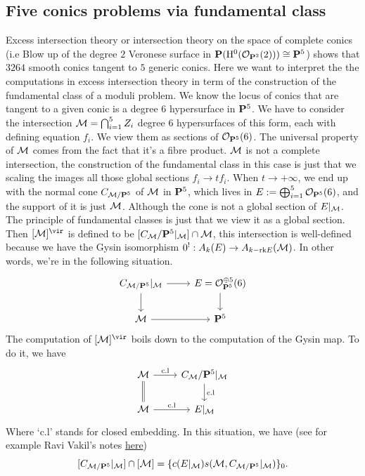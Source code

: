 \documentclass[../main.tex]{subfiles}
\begin{document}
\subsection{Five conics problems via fundamental class}
Excess intersection theory or intersection theory on the space of complete conics (i.e Blow up of the degree $2$ Veronese surface in $\P(\H^{0}(\O_{\P^{2}}(2)))\cong \P^{5}$) shows that $3264$ smooth conics tangent to $5$ generic conics. Here we want to interpret the the computations in excess intersection theory in term of the construction of the fundamental class of a moduli problem. We know the locus of conics that are tangent to a given conic is a degree $6$ hypersurface in $\P^{5}$. We have to consider the intersection $\M=\bigcap_{i=1}^{5}Z_{i}$ degree $6$ hypersurfaces of this form, each with defining equation $f_{i}$. We view them as sections of $\O_{\P^{5}}(6)$. The universal property of $\M$ comes from the fact that it's a fibre product. $\M$ is not a complete intersection, the construction of the fundamental class in this case is just that we scaling the images all those global sections $f_{i}\rightarrow tf_{i}$. When $t\rightarrow +\infty$, we end up with the normal cone $C_{\M/\P^{5}}$ of $\M$ in $\P^{5}$, which lives in $E:=\bigoplus_{i=1}^{5}\O_{\P^{5}}(6)$, and the support of it is just $\M$.  Although the cone is not a global section of $E|_{\M}$. The principle of fundamental classes is just that we view it as a global section. Then $[\M]^{\vir}$ is defined to be $[C_{\M}/\P^{5}|_{\M}]\cap \M$, this intersection is well-defined because we have the Gysin isomorphism $0^{!}: A_{k}(E)\rightarrow A_{k-\mathrm{rk}{E}}(\M)$. In other words, we're in the following situation.
$$
\begin{tikzcd}
C_{\M/\P^{5}}|_{\M}\arrow{r}\arrow{d} & E=\O^{\oplus 5}_{\P^{5}}(6)\arrow{d}\\
\M\arrow{r} &\P^{5}
\end{tikzcd}
$$
The computation of $[\M]^{\vir}$ boils down to the computation of the Gysin map. To do it, we have
$$\begin{tikzcd}
\M\arrow[d, equal]\arrow{r}{\text{c.l}} & C_{\M}/\P^{5}|_{\M}\arrow{d}{\text{c.l}}\\
\M \arrow{r}{\text{c.l}} & E|_{\M}
\end{tikzcd}
$$
Where `c.l' stands for closed embedding. In this situation, we have (see for example Ravi Vakil's notes \href{http://math.stanford.edu/~vakil/245/245class16.pdf}{here}) 
$$[C_{\M/\P^{5}}|_{\M}]\cap [\M]=\{c(E|_{\M})s(\M, C_{\M/\P^{5}}|_{\M})\}_{0}.$$
\end{document}
